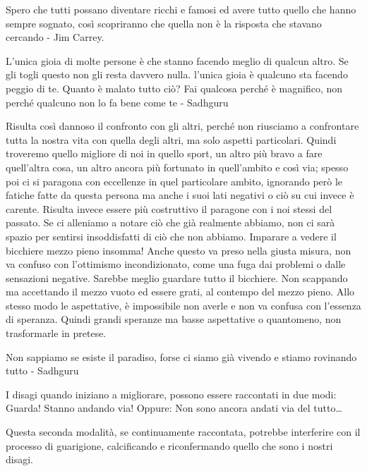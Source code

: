 \documentclass[12pt]{book} %
\begin{document}
Spero che tutti possano diventare ricchi e famosi ed avere tutto quello che hanno sempre sognato, così scopriranno che
quella non è la risposta che stavano cercando - Jim Carrey.

L'unica gioia di molte persone è che stanno facendo meglio di qualcun altro. Se gli togli questo non gli resta davvero nulla. l'unica gioia è qualcuno sta facendo peggio di te. Quanto è malato tutto ciò? Fai qualcosa perché è magnifico, non perché qualcuno non lo fa bene come te - Sadhguru

Risulta così dannoso il confronto con gli altri, perché non riusciamo a confrontare tutta la nostra vita con quella
degli altri, ma solo aspetti particolari. Quindi troveremo quello migliore di noi in quello sport, un altro più bravo a
fare quell'altra cosa, un altro ancora più fortunato in quell'ambito e così
via; spesso poi ci si paragona con eccellenze in quel particolare ambito, ignorando però le fatiche fatte da questa persona ma anche i suoi lati negativi o ciò su cui invece è carente. Risulta invece essere più costruttivo il paragone
con i noi stessi del passato. 
Se ci alleniamo a notare ciò che già realmente abbiamo, non ci sarà spazio per sentirsi
insoddisfatti di ciò che non abbiamo. Imparare a vedere il bicchiere mezzo pieno insomma! 
Anche questo va preso nella giusta misura, non va confuso con l'ottimismo
incondizionato, come una fuga dai problemi o dalle sensazioni negative. Sarebbe meglio guardare tutto il bicchiere. Non
scappando ma accettando il mezzo vuoto ed essere grati, al contempo del mezzo pieno. Allo stesso modo le aspettative, è
impossibile non averle e non va confusa con l'essenza di speranza. Quindi grandi speranze ma basse
aspettative o quantomeno, non trasformarle in pretese.

Non sappiamo se esiste il paradiso, forse ci siamo già vivendo e stiamo rovinando tutto - Sadhguru

I disagi quando iniziano a migliorare, possono essere raccontati in due modi:
Guarda! Stanno andando via!
Oppure:
Non sono ancora andati via del tutto…

Questa seconda modalità, se continuamente raccontata, potrebbe interferire con il processo di guarigione, calcificando e riconfermando quello che sono i nostri disagi.
\end{document}
